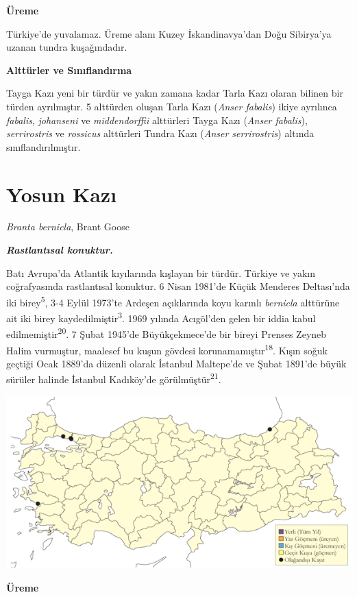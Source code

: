 \documentclass[
  letterpaper,
  DIV=11,
  numbers=noendperiod]{scrreprt}
\begin{document}
\textbf{Üreme}

Türkiye'de yuvalamaz. Üreme alanı Kuzey İskandinavya'dan Doğu Sibirya'ya
uzanan tundra kuşağındadır.

\textbf{Alttürler ve Sınıflandırma}

Tayga Kazı yeni bir türdür ve yakın zamana kadar Tarla Kazı olaran
bilinen bir türden ayrılmıştır. 5 alttürden oluşan Tarla Kazı
(\emph{Anser fabalis}) ikiye ayrılınca \emph{fabalis}, \emph{johanseni}
ve \emph{middendorffii} alttürleri Tayga Kazı (\emph{Anser fabalis}),
\emph{serrirostris} ve \emph{rossicus} alttürleri Tundra Kazı
(\emph{Anser serrirostris}) altında sınıflandırılmıştır.

\section{Yosun Kazı}\label{yosun-kazux131}

\emph{Branta bernicla}, Brant Goose

\textbf{\emph{Rastlantısal konuktur.}}

Batı Avrupa'da Atlantik kıyılarında kışlayan bir türdür. Türkiye ve
yakın coğrafyasında rastlantısal konuktur. 6 Nisan 1981'de Küçük
Menderes Deltası'nda iki birey\textsuperscript{5}, 3-4 Eylül 1973'te
Ardeşen açıklarında koyu karınlı \emph{bernicla} alttürüne ait iki birey
kaydedilmiştir\textsuperscript{3}. 1969 yılında Acıgöl'den gelen bir
iddia kabul edilmemiştir\textsuperscript{20}. 7 Şubat 1945'de
Büyükçekmece'de bir bireyi Prenses Zeyneb Halim vurmuştur, maalesef bu
kuşun gövdesi korunamamıştır\textsuperscript{18}. Kışın soğuk geçtiği
Ocak 1889'da düzenli olarak İstanbul Maltepe'de ve Şubat 1891'de büyük
sürüler halinde İstanbul Kadıköy'de görülmüştür\textsuperscript{21}.

\includegraphics{images/harita_Page_005.png}

\textbf{Üreme}
\end{document}
